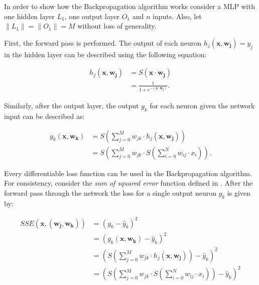 In order to show how the Backpropagation algorithm works consider a MLP with one hidden layer $L_1$, one output layer $O_1$ and $n$ inputs.
Also, let $\lVert L_1 \rVert = \lVert O_1 \rVert = M$ without loss of generality.

First, the forward pass is performed.
The output of each neuron $h_j(\bm{x}, \bm{w_j}) = y_j$ in the hidden layer can be described using the following equation:

\begin{equation}
    \begin{split}
        h_j(\bm{x}, \bm{w_j})
        &= S(\bm{x} \cdot \bm{w_j}) \\
        &= \frac{1}{1 + e^{-(\bm{x} \cdot \bm{w_j})}}.
    \end{split}
\end{equation}

Similarly, after the output layer, the output $g_k$ for each neuron given the network input can be described as:

\begin{equation}
    \begin{split}
        g_k(\bm{x}, \bm{w_k})
        &= S\left(\sum_{j=0}^M w_{jk} \cdot h_j(\bm{x}, \bm{w_j})\right) \\
        &= S\left(\sum_{j=0}^M w_{jk} \cdot S \left(\sum_{i=0}^N w_{ij} \cdot x_i\right)\right).
    \end{split}
\end{equation}

Every differentiable loss function can be used in the Backpropagation algorithm.
For consistency, consider the \textit{sum of squared error} function defined in .
After the forward pass through the network the loss for a single output neuron $g_k$ is given by:

\begin{equation}
    \begin{split}
        SSE(\bm{x}, (\bm{w_j}, \bm{w_k}))
        &= (y_k - \hat{y}_{k})^2 \\
        &= (g_k(\bm{x},\bm{w_k}) - \hat{y}_{k})^2 \\
        &= \left(S \left(\sum_{j=0}^M w_{jk} \cdot h_j(\bm{x}, \bm{w_j})\right) - \hat{y}_{k}\right)^2 \\
        &=  \left( S\left(\sum_{j=0}^M w_{jk} \cdot S \left(\sum_{i=0}^N w_{ij} \cdot x_i\right)\right) - \hat{y}_{k}\right)^2
    \end{split}
\end{equation}

